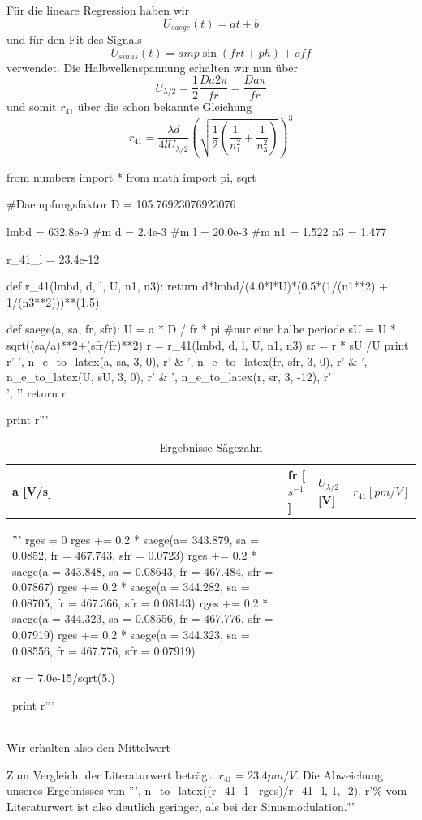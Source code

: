 Für die lineare Regression haben wir
$$ U_{saege}(t) = a  t + b $$
und für den Fit des Signals
$$ U_{sinus}(t) = \mathit{amp}  \sin(\mathit{fr} t + \mathit{ph}) + \mathit{off} $$
verwendet. Die Halbwellenspannung erhalten wir nun über
$$ U_{\lambda/2} = \frac{1}{2}\frac{D a 2 \pi}{ fr} =  \frac{D a \pi}{fr} $$
und somit $r_{41}$ über die schon bekannte Gleichung
$$ r_{41} = \frac{\lambda d}{4l U_{\lambda / 2}} \left(  \sqrt{\frac{1}{2} \left( \frac{1}{n_1^2} + \frac{1}{n_3^2} \right)} \right)^3 $$


\begin{python}
from numbers import *
from math import pi, sqrt

#Daempfungsfaktor
D = 105.76923076923076

lmbd = 632.8e-9 #m
d = 2.4e-3 #m
l = 20.0e-3 #m
n1 = 1.522
n3 = 1.477

r_41_l = 23.4e-12

def r_41(lmbd, d, l, U, n1, n3):
  return d*lmbd/(4.0*l*U)*(0.5*(1/(n1**2) + 1/(n3**2)))**(1.5)

def saege(a, sa, fr, sfr):
  U = a * D / fr * pi #nur eine halbe periode
  sU = U * sqrt((sa/a)**2+(sfr/fr)**2)
  r = r_41(lmbd, d, l, U, n1, n3)
  sr = r * sU /U
  print r' ', n_e_to_latex(a, sa, 3, 0), r' & ', n_e_to_latex(fr, sfr, 3, 0), r' & ', n_e_to_latex(U, sU, 3, 0), r' & ', n_e_to_latex(r, sr, 3, -12), r'\\', '\n'
  return r

print r'''\begin{table}[H]
 \centering
 \begin{tabular}{llll}
  \toprule
  a [V/s]  &  fr [ $s^{-1}$] & $U_{\lambda/2}$ [V] & $r_{41} [pm/V]$ \\
  \midrule
'''
rges = 0
rges += 0.2 * saege(a= 343.879, sa = 0.0852, fr = 467.743, sfr = 0.0723)
rges += 0.2 * saege(a = 343.848, sa = 0.08643, fr = 467.484, sfr = 0.07867)
rges += 0.2 * saege(a = 344.282, sa = 0.08705, fr = 467.366, sfr = 0.08143)
rges += 0.2 * saege(a = 344.323, sa = 0.08556, fr = 467.776, sfr = 0.07919)
rges += 0.2 * saege(a = 344.323, sa = 0.08556, fr = 467.776, sfr = 0.07919)

sr = 7.0e-15/sqrt(5.)

print r'''
\bottomrule

\end{tabular}
\caption{Ergebnisse S\"agezahn}
\end{table}

Wir erhalten also den Mittelwert\\
\begin{center}
\end{center}

Zum Vergleich, der Literaturwert betr\"agt: $r_{41} = 23.4 pm/V$. 
Die Abweichung unseres Ergebnisses von ''', n_to_latex((r_41_l - rges)/r_41_l, 1, -2), r'\%  vom Literaturwert ist also deutlich geringer, als bei der Sinusmodulation.'''

\end{python}

